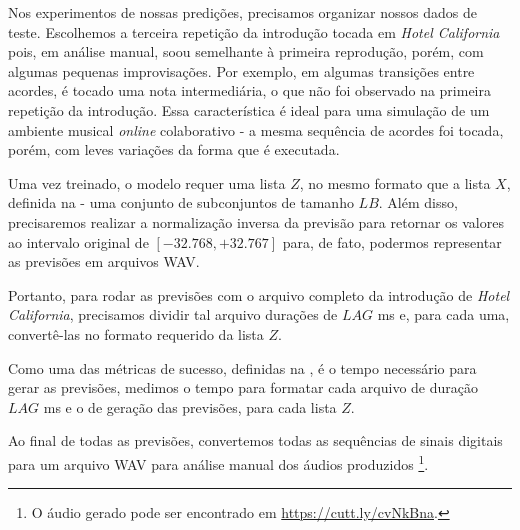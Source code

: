 Nos experimentos de nossas predições, precisamos organizar nossos dados de teste. Escolhemos a terceira repetição da introdução tocada em \textit{Hotel California} pois, em análise manual, soou semelhante à primeira reprodução, porém, com algumas pequenas improvisações. Por exemplo, em algumas transições entre acordes, é tocado uma nota intermediária, o que não foi observado na primeira repetição da introdução. Essa característica é ideal para uma simulação de um ambiente musical \textit{online} colaborativo - a mesma sequência de acordes foi tocada, porém, com leves variações da forma que é executada.

Uma vez treinado, o modelo requer uma lista $Z$, no mesmo formato que a lista $X$, definida na  - uma conjunto de subconjuntos de tamanho $LB$. Além disso, precisaremos realizar a normalização inversa da previsão para retornar os valores ao intervalo original de $[-32.768, +32.767]$ para, de fato, podermos representar as previsões em arquivos WAV.

Portanto, para rodar as previsões com o arquivo completo da introdução de \textit{Hotel California}, precisamos dividir tal arquivo durações de $LAG$ ms e, para cada uma, convertê-las no formato requerido da lista $Z$.

Como uma das métricas de sucesso, definidas na , é o tempo necessário para gerar as previsões, medimos o tempo para formatar cada arquivo de duração $LAG$ ms e o de geração das previsões, para cada lista $Z$.

Ao final de todas as previsões, convertemos todas as sequências de sinais digitais para um arquivo WAV para análise manual dos áudios produzidos \footnote{O áudio gerado pode ser encontrado em \url{https://cutt.ly/cvNkBna}.}.